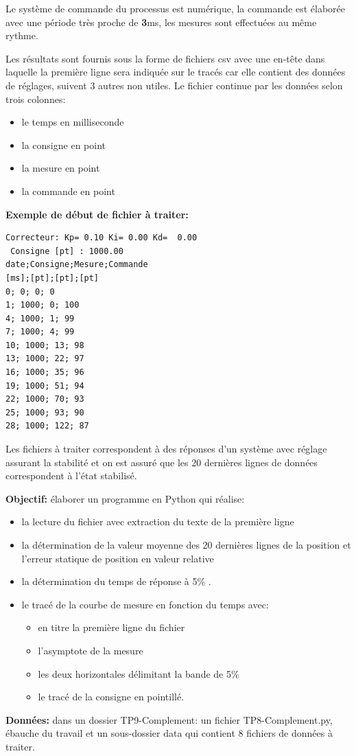 \documentclass[12pt,a4paper]{article}
\begin{document}
Le système de commande du processus est numérique, la commande est élaborée avec une période très proche de \textbf{3}ms, les mesures sont effectuées au même rythme. 

Les résultats sont fournis sous la forme de fichiers csv avec une en-tête dans laquelle la première ligne sera indiquée sur le tracés car elle contient des données de réglages, suivent 3 autres non utiles.
Le fichier continue par les données selon trois colonnes:
\begin{itemize}
\item le temps en milliseconde
\item la consigne en point 
\item la mesure en point
\item la commande en point
\end{itemize}

\medskip

\textbf{Exemple de début de fichier à traiter:}

\hspace{3cm}\begin{minipage}[c]{0.5\linewidth}
\begin{verbatim}
Correcteur: Kp= 0.10 Ki= 0.00 Kd=  0.00
 Consigne [pt] : 1000.00
date;Consigne;Mesure;Commande
[ms];[pt];[pt];[pt]
0; 0; 0; 0
1; 1000; 0; 100
4; 1000; 1; 99
7; 1000; 4; 99
10; 1000; 13; 98
13; 1000; 22; 97
16; 1000; 35; 96
19; 1000; 51; 94
22; 1000; 70; 93
25; 1000; 93; 90
28; 1000; 122; 87
\end{verbatim}
\end{minipage}

\medskip

Les fichiers à traiter correspondent à des réponses d'un système avec réglage assurant la stabilité et on est assuré que les 20 dernières lignes de données correspondent à l'état stabilisé.
\bigskip

\textbf{Objectif:} élaborer un programme en Python qui réalise:
\begin{itemize}
\item la lecture du fichier avec extraction du texte de la première ligne
\item la détermination de la valeur moyenne des 20 dernières lignes de la position et l'erreur statique de position en valeur relative
\item la détermination du temps de réponse à 5\% .
\item le tracé de la courbe de mesure en fonction du temps avec:
\begin{itemize}
\item en titre la première ligne du fichier
\item l'asymptote de la mesure
\item les deux horizontales délimitant la bande de 5\% 
\item le tracé de la consigne en pointillé.
\end{itemize}
\end{itemize}  

\medskip

\textbf{Données:}
dans un dossier TP9-Complement: un fichier TP8-Complement.py, ébauche du travail et un sous-dossier data qui contient 8 fichiers de données à traiter.

  
\end{document}
